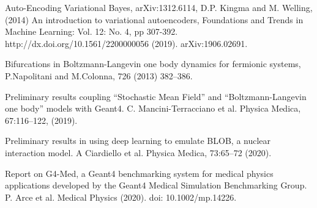 \begin{thebibliography}{99}
 Auto-Encoding Variational Bayes, arXiv:1312.6114, D.P. Kingma and M. Welling, (2014)
 An introduction to variational autoencoders, Foundations and Trends in Machine Learning: Vol. 12: No. 4, pp 307-392. http://dx.doi.org/10.1561/2200000056 (2019). arXiv:1906.02691.

 Bifurcations in Boltzmann-Langevin one body dynamics for fermionic systems, P.Napolitani and M.Colonna, 726 (2013) 382–386.

 Preliminary results coupling “Stochastic Mean Field” and “Boltzmann-Langevin one body” models with Geant4. C. Mancini-Terracciano et al. Physica Medica, 67:116–122, (2019).

 Preliminary results in using deep
learning to emulate BLOB, a nuclear interaction model. A Ciardiello et al. Physica Medica, 73:65–72 (2020).

 Report on G4-Med, a Geant4 benchmarking system for medical physics applications developed by the Geant4 Medical Simulation Benchmarking Group. P. Arce et al. Medical Physics (2020). doi: 10.1002/mp.14226.

\end{thebibliography}